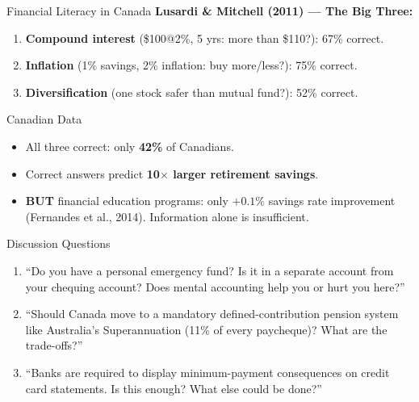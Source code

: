 \documentclass[aspectratio=169]{beamer}
\begin{document}
\begin{frame}{Financial Literacy in Canada}
\textcolor{beblue}{\textbf{Lusardi \& Mitchell (2011) --- The Big Three:}}
\begin{enumerate}\small
  \item \textbf{Compound interest} (\$100@2\%, 5 yrs: more than \$110?): \textcolor{beteal}{67\%} correct.
  \item \textbf{Inflation} (1\% savings, 2\% inflation: buy more/less?): \textcolor{beteal}{75\%} correct.
  \item \textbf{Diversification} (one stock safer than mutual fund?): \textcolor{berust}{52\%} correct.
\end{enumerate}
\begin{alertblock}{Canadian Data}
\begin{itemize}\small
  \item All three correct: only \textbf{42\%} of Canadians.
  \item Correct answers predict \textbf{10$\times$ larger retirement savings}.
  \item \textbf{BUT} financial education programs: only $+0.1\%$ savings rate improvement (Fernandes et al., 2014). Information alone is insufficient.
\end{itemize}
\end{alertblock}
\end{frame}

\begin{frame}{Discussion Questions}
\begin{enumerate}
  \item[\textcolor{bepurple}{Q1.}] ``Do you have a personal emergency fund? Is it in a separate account from your chequing account? Does mental accounting help you or hurt you here?''
  \medskip
  \item[\textcolor{beteal}{Q2.}] ``Should Canada move to a mandatory defined-contribution pension system like Australia's Superannuation (11\% of every paycheque)? What are the trade-offs?''
  \medskip
  \item[\textcolor{berust}{Q3.}] ``Banks are required to display minimum-payment consequences on credit card statements. Is this enough? What else could be done?''
\end{enumerate}
\end{frame}
\end{document}

